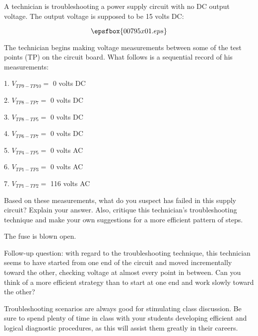 

A technician is troubleshooting a power supply circuit with no DC output voltage.  The output voltage is supposed to be 15 volts DC:

$$\epsfbox{00795x01.eps}$$

The technician begins making voltage measurements between some of the test points (TP) on the circuit board.  What follows is a sequential record of his measurements:

\medskip
\goodbreak
\item{1.} $V_{TP9-TP10} =$ 0 volts DC
\item{2.} $V_{TP8-TP7} =$ 0 volts DC
\item{3.} $V_{TP8-TP5} =$ 0 volts DC
\item{4.} $V_{TP6-TP7} =$ 0 volts DC
\item{5.} $V_{TP4-TP5} =$ 0 volts AC
\item{6.} $V_{TP1-TP3} =$ 0 volts AC
\item{7.} $V_{TP1-TP2} =$ 116 volts AC
\medskip

Based on these measurements, what do you suspect has failed in this supply circuit?  Explain your answer.  Also, critique this technician's troubleshooting technique and make your own suggestions for a more efficient pattern of steps.







The fuse is blown open.  

\vskip 10pt

Follow-up question: with regard to the troubleshooting technique, this technician seems to have started from one end of the circuit and moved incrementally toward the other, checking voltage at almost every point in between.  Can you think of a more efficient strategy than to start at one end and work slowly toward the other?







Troubleshooting scenarios are always good for stimulating class discussion.  Be sure to spend plenty of time in class with your students developing efficient and logical diagnostic procedures, as this will assist them greatly in their careers.




